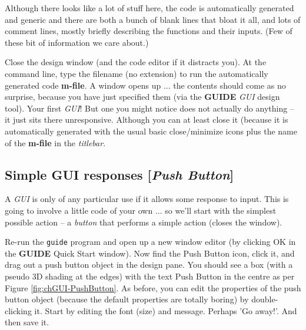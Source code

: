 \documentclass{tufte-book} %
\begin{document}
Although there looks like a lot of stuff here, the code is automatically generated and generic and there are both a bunch of blank lines that bloat it all, and lots of comment lines, mostly briefly describing the functions and their inputs. (Few of these bit of information we care about.) 

Close the design window (and the code editor if it distracts you). At the command line, type the filename (no extension) to run the automatically generated code \textbf{m-file}. A window opens up ... the contents should come as no surprise, because you have just specified them (via the \textbf{GUIDE} \textit{GUI} design tool). Your first \textit{GUI}! But one you might notice does not actually do anything -- it just sits there unresponsive. Although you can at least close it (because it is automatically generated with the usual basic close/minimize icons plus the name of the \textbf{m-file} in the \textit{titlebar}.


\subsection{Simple GUI responses [\textit{Push Button}]}

A \textit{GUI} is only of any particular use if it allows some response to input. This is going to involve a little code of your own ... so we'll start with the simplest possible action -- a \textit{button} that performs a simple action (closes the window).

Re-run the \texttt{guide} program and open up a new window editor (by clicking \textsf{OK} in the \textbf{GUIDE} \textsf{Quick Start} window). Now find the \textsf{Push Button} icon, click it, and drag out a push button object in the design pane. You should see a box (with a pseudo 3D shading at the edges) with the text \textsf{Push Button} in the centre as per Figure \ref{fig:chGUI-PushButton}. As before, you can edit the properties of the push button object (because the default properties are totally boring) by double-clicking it. Start by editing the font (size) and message. Perhaps 'Go away!'. And then save it.
\end{document}
